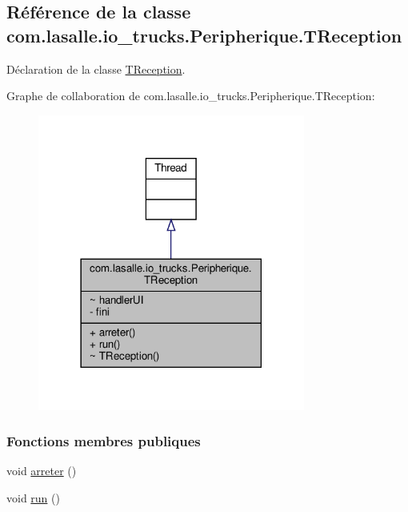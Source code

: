 \hypertarget{classcom_1_1lasalle_1_1io__trucks_1_1_peripherique_1_1_t_reception}{}\subsection{Référence de la classe com.\+lasalle.\+io\+\_\+trucks.\+Peripherique.\+T\+Reception}
\label{classcom_1_1lasalle_1_1io__trucks_1_1_peripherique_1_1_t_reception}


Déclaration de la classe \hyperlink{classcom_1_1lasalle_1_1io__trucks_1_1_peripherique_1_1_t_reception}{T\+Reception}.  




Graphe de collaboration de com.\+lasalle.\+io\+\_\+trucks.\+Peripherique.\+T\+Reception\+:
\nopagebreak
\begin{figure}[H]
\begin{center}
\leavevmode
\includegraphics[width=249pt]{classcom_1_1lasalle_1_1io__trucks_1_1_peripherique_1_1_t_reception__coll__graph}
\end{center}
\end{figure}
\subsubsection*{Fonctions membres publiques}
\begin{DoxyCompactItemize}
\item 
void \hyperlink{classcom_1_1lasalle_1_1io__trucks_1_1_peripherique_1_1_t_reception_ad02425d61d6c923521c8f66f6b854b3c}{arreter} ()
\item 
void \hyperlink{classcom_1_1lasalle_1_1io__trucks_1_1_peripherique_1_1_t_reception_a13e01a4a1d897c8643f63494b9f091cc}{run} ()
\end{DoxyCompactItemize}
